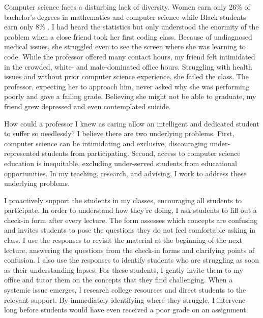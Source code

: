 \documentclass[11pt]{article}
\begin{document}
{\setlength{\parindent}{0cm}

Computer science faces a disturbing lack of diversity. Women earn only 26\% of bachelor's degrees in mathematics and computer science while Black students earn only 8\% \cite{national2023diversity}. I had heard the statistics but only understood the enormity of the problem when a close friend took her first coding class. Because of undiagnosed medical issues, she struggled even to see the screen where she was learning to code. While the professor offered many contact hours, my friend felt intimidated in the crowded, white- and male-dominated office hours. Struggling with health issues and without prior computer science experience, she failed the class. The professor, expecting her to approach him, never asked why she was performing poorly and gave a failing grade. Believing she might not be able to graduate, my friend grew depressed and even contemplated suicide.

How could a professor I knew as caring allow an intelligent and dedicated student to suffer so needlessly? I believe there are two underlying problems. First, computer science can be intimidating and exclusive, discouraging under-represented students from participating. Second, access to computer science education is inequitable, excluding under-served students from educational opportunities. In my teaching, research, and advising, I work to address these underlying problems.

I proactively support the students in my classes, encouraging all students to participate. In order to understand how they're doing, I ask students to fill out a check-in form after every lecture. The form assesses which concepts are confusing and invites students to pose the questions they do not feel comfortable asking in class. I use the responses to revisit the material at the beginning of the next lecture, answering the questions from the check-in forms and clarifying points of confusion. I also use the responses to identify students who are struggling as soon as their understanding lapses. For these students, I gently invite them to my office and tutor them on the concepts that they find challenging. When a systemic issue emerges, I research college resources and direct students to the relevant support. By immediately identifying where they struggle, I intervene long before students would have even received a poor grade on an assignment.

}
\end{document}
